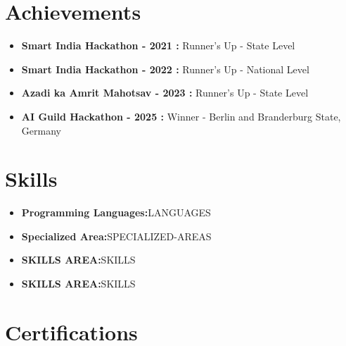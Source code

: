 \documentclass[a4paper,11pt]{article}
\newcommand{\resumeItem}[2]{
  \item{
    \textbf{#1}{\hspace{0.5mm}#2 \vspace{-0.5mm}}
  }
}
\newcommand{\resumeSubItem}[2]{\resumeItem{#1}{#2}\vspace{-4pt}}
\newcommand{\resumeHeadingSkillStart}{\begin{itemize}[leftmargin=*,itemsep=1.7mm, rightmargin=2ex]}
\newcommand{\resumeHeadingSkillEnd}{\end{itemize}\vspace{-2mm}}
\begin{document}
\section{\textbf{Achievements }}
\vspace{-0.4mm}

 \resumeHeadingSkillStart
\vspace{1mm}
\vspace{-0.4mm}
\resumeSubItem{Smart India Hackathon - 2021 : } {Runner's Up - State Level}
\vspace{-0.4mm}
\resumeSubItem{Smart India Hackathon - 2022 : } {Runner's Up - National Level}
\vspace{-0.4mm}
\resumeSubItem{Azadi ka Amrit Mahotsav - 2023 : } {Runner's Up - State Level}
\vspace{-0.4mm}
\resumeSubItem{AI Guild Hackathon - 2025 : } {Winner - Berlin and Branderburg State, Germany}
  
  \resumeHeadingSkillEnd




\section{\textbf{Skills}}
\vspace{-0.4mm}
 \resumeHeadingSkillStart
  \vspace{1mm}
  \resumeSubItem{Programming Languages:}
    {LANGUAGES}

\resumeSubItem{Specialized Area:}
    {SPECIALIZED-AREAS}
  
  \resumeSubItem{SKILLS AREA:}
    {SKILLS}

\resumeSubItem{SKILLS AREA:}
    {SKILLS}


  
  \resumeHeadingSkillEnd




\section{\textbf{Certifications}}
\end{document}
